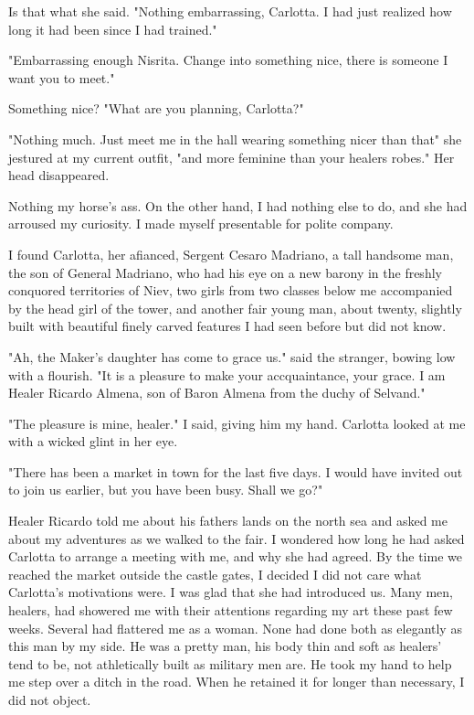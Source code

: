 \documentclass{article}
\begin{document}
Is that what she said. "Nothing embarrassing, Carlotta. I had just realized how long it had been since I had trained."

"Embarrassing enough Nisrita. Change into something nice, there is someone I want you to meet."

Something nice? "What are you planning, Carlotta?"

"Nothing much. Just meet me in the hall wearing something nicer than that" she jestured at my current outfit, "and more feminine than your healers robes." Her head disappeared.

Nothing my horse's ass. On the other hand, I had nothing else to do, and she had arroused my curiosity. I made myself presentable for polite company.

I found Carlotta, her afianced, Sergent Cesaro Madriano, a tall handsome man, the son of General Madriano, who had his eye on a new barony in the freshly conquored territories of Niev, two girls from two classes below me accompanied by the head girl of the tower, and another fair young man, about twenty, slightly built with beautiful finely carved features I had seen before but did not know. 

"Ah, the Maker's daughter has come to grace us." said the stranger, bowing low with a flourish. "It is a pleasure to make your accquaintance, your grace. I am Healer Ricardo Almena, son of Baron Almena from the duchy of Selvand." 

"The pleasure is mine, healer." I said, giving him my hand. Carlotta looked at me with a wicked glint in her eye. 

"There has been a market in town for the last five days. I would have invited out to join us earlier, but you have been busy. Shall we go?"

Healer Ricardo told me about his fathers lands on the north sea and asked me about my adventures as we walked to the fair. I wondered how long he had asked Carlotta to arrange a meeting with me, and why she had agreed. By the time we reached the market outside the castle gates, I decided I did not care what Carlotta's motivations were. I was glad that she had introduced us. Many men, healers, had showered me with their attentions regarding my art these past few weeks. Several had flattered me as a woman. None had done both as elegantly as this man by my side. He was a pretty man, his body thin and soft as healers' tend to be, not athletically built as military men are. He took my hand to help me step over  a ditch in the road. When he retained it for longer than necessary, I did not object.
\end{document}
